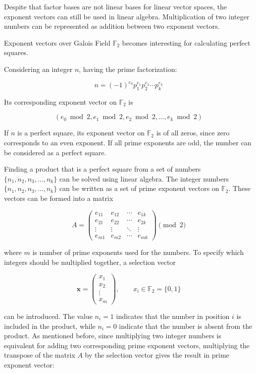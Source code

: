 \documentclass[11pt,a4paper]{article}
\begin{document}
Despite that factor bases are not linear bases for linear vector spaces, the exponent vectors can still be used in linear algebra. Multiplication of two integer numbers can be represented as addition between two exponent vectors.

Exponent vectors over Galois Field $\mathbb{F}_2$ becomes interesting for calculating perfect squares.

Considering an integer $n$, having the prime factorization:

$$
n = (-1)^{e_0} p_1^{e_1}p_2^{e_2}\cdots p_k^{e_k}
$$

Its corresponding exponent vector on $\mathbb{F}_2$ is

$$
(e_0\bmod 2, e_1\bmod 2, e_2\bmod 2,\ldots, e_k\bmod 2)
$$

If $n$ is a perfect square, its exponent vector on $\mathbb{F}_2$ is of all zeros, since zero corresponds to an even exponent. If all prime exponents are odd, the number can be considered as a perfect square.

Finding a product that is a perfect square from a set of numbers $\{n_1, n_2, n_3, \ldots, n_k\}$ can be solved using linear algebra. The integer numbers $\{n_1, n_2, n_3, \ldots, n_k\}$ can be written as a set of prime exponent vectors on $\mathbb{F}_2$. These vectors can be formed into a matrix 

\[
A =
\begin{pmatrix}
e_{11} & e_{12} & \cdots & e_{1k} \\
e_{21} & e_{22} & \cdots & e_{2k} \\
\vdots & \vdots & \ddots & \vdots \\
e_{m1} & e_{m2} & \cdots & e_{mk}
\end{pmatrix}
\pmod{2}
\]

where $m$ is number of prime exponents used for the numbers. To specify which integers should be multiplied together, a selection vector

\[
\mathbf{x} =
\begin{pmatrix}
x_1 \\
x_2 \\
\vdots \\
x_m
\end{pmatrix},
\qquad x_i \in \mathbb{F}_2 = \{0,1\}
\]

can be introduced. The value $n_i = 1$ indicates that the number in position $i$ is included in the product, while $n_i = 0$ indicate that the number is absent from the product. As mentioned before, since multiplying two integer numbers is equivalent for adding two corresponding prime exponent vectors, multiplying the transpose of the matrix $A$ by the selection vector gives the result in prime exponent vector:
\end{document}
